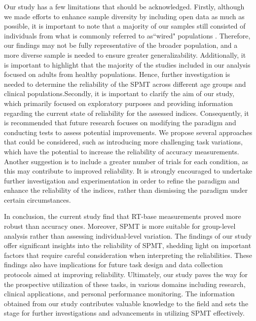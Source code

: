 \documentclass[sn-apa]{sn-jnl}%
\theoremstyle{thmstyleone}%
\theoremstyle{thmstyletwo}%
\theoremstyle{thmstylethree}%
\begin{document}
Our study has a few limitations that should be acknowledged. Firstly, although we made efforts to enhance sample diversity by including open data as much as possible, it is important to note that a majority of our samples still consisted of individuals from what is commonly referred to as``wired" populations \parencite{rad2018toward}. Therefore, our findings may not be fully representative of the broader population, and a more diverse sample is needed to ensure greater generalizability. Additionally, it is important to highlight that the majority of the studies included in our analysis focused on adults from healthy populations. Hence, further investigation is needed to determine the reliability of the SPMT across different age groups and clinical populations.Secondly, it is important to clarify the aim of our study, which primarily focused on exploratory purposes and providing information regarding the current state of reliability for the assessed indices. Consequently, it is recommended that future research focuses on modifying the paradigm and conducting tests to assess potential improvements. We propose several approaches that could be considered, such as introducing more challenging task variations, which have the potential to increase the reliability of accuracy measurements. Another suggestion is to include a greater number of trials for each condition, as this may contribute to improved reliability. It is strongly encouraged to undertake further investigation and experimentation in order to refine the paradigm and enhance the reliability of the indices, rather than dismissing the paradigm under certain circumstances.

In conclusion, the current study find that RT-base measurements proved more robust than accuracy ones. Moreover, SPMT is more suitable for group-level analysis rather than assessing individual-level variation. The findings of our study offer significant insights into the reliability of SPMT, shedding light on important factors that require careful consideration when interpreting the reliabilities. These findings also have implications for future task design and data collection protocols aimed at improving reliability. Ultimately, our study paves the way for the prospective utilization of these tasks, in various domains including research, clinical applications, and personal performance monitoring. The information obtained from our study contributes valuable knowledge to the field and sets the stage for further investigations and advancements in utilizing SPMT effectively.
\end{document}
